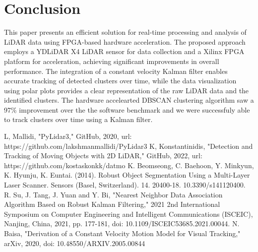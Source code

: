 \documentclass[journal]{IEEEtran} %
\begin{document}
\section{Conclusion}

This paper presents an efficient solution for real-time processing and analysis of LiDAR data using FPGA-based hardware acceleration. The proposed approach employs a YDLiDAR X4 LiDAR sensor for data collection and a Xilinx FPGA platform for acceleration, achieving significant improvements in overall performance. The integration of a constant velocity Kalman filter enables accurate tracking of detected clusters over time, while the data visualization using polar plots provides a clear representation of the raw LiDAR data and the identified clusters. The hardware accelearted DBSCAN clustering algorithm saw a 97\% improvement over the the software benchmark and we were successfuly able to track clusters over time using a Kalman filter.

\begin{thebibliography}{00}
     L, Mallidi, "PyLidar3," GitHub, 2020, url: https://github.com/lakshmanmallidi/PyLidar3
     K, Konstantinidis, "Detection and Tracking of Moving Objects with 2D LiDAR," GitHub, 2022, url: https://github.com/kostaskonkk/datmo
     K. Beomseong, C. Baehoon, Y. Minkyun, K. Hyunju, K. Euntai. (2014). Robust Object Segmentation Using a Multi-Layer Laser Scanner. Sensors (Basel, Switzerland). 14. 20400-18. 10.3390/s141120400. 
     R. Su, J. Tang, J. Yuan and Y. Bi, "Nearest Neighbor Data Association Algorithm Based on Robust Kalman Filtering," 2021 2nd International Symposium on Computer Engineering and Intelligent Communications (ISCEIC), Nanjing, China, 2021, pp. 177-181, doi: 10.1109/ISCEIC53685.2021.00044.
     N. Baisa, "Derivation of a Constant Velocity Motion Model for Visual Tracking," arXiv, 2020, doi: 10.48550/ARXIV.2005.00844

\end{thebibliography}
\end{document}
